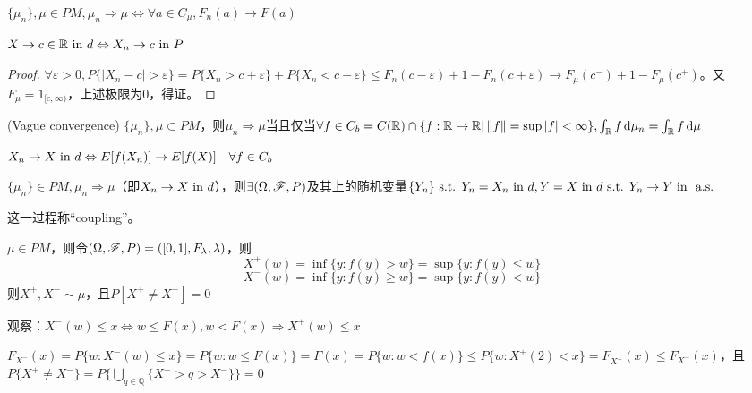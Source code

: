 \documentclass{ctexart}
\begin{document}
\begin{Cor}
  $\{\mu_{n}\},\mu\in PM,\mu_{n}\Rightarrow \mu\Leftrightarrow \forall a\in C_{\mu}, F_{n}(a)\to F(a)$
\end{Cor}

\begin{Prop}
  $X\to c\in\mathbb{R}\text{ in } d\Leftrightarrow X_{n}\to c\text{ in } P$
\end{Prop}

\begin{proof}
  $\forall\varepsilon>0, P\{|X_{n}-c|>\varepsilon\}=P\{X_{n}>c+\varepsilon\}+P\{X_{n}<c-\varepsilon\}\leq F_{n}(c-\varepsilon)+1-F_{n}(c+\varepsilon)\to F_{\mu}(c^{-})+1-F_{\mu}(c^{+})$。又$F_{\mu}=1_{[c,\infty)}$，上述极限为$0$，得证。
\end{proof}

\begin{Thm}(Vague convergence)
  $\{\mu_{n}\},\mu\subset PM$，则$\mu_{n}\Rightarrow \mu$当且仅当$\forall f\in C_{b}=C(\mathbb{R})\cap \{f:\mathbb{R}\to \mathbb{R} | \left\|f\right\|=\sup|f|<\infty\}, \int_{\mathbb{R}}f\,\mathrm{d}\mu_{n}=\int_{\mathbb{R}}f\,\mathrm{d}\mu$
\end{Thm}

\begin{Cor}
  $X_{n}\to X\text{ in } d\Leftrightarrow E[f(X_{n})]\to E[f(X)]\quad \forall f\in C_{b}$
\end{Cor}

\begin{Thm}
  $\{\mu_{n}\}\in PM, \mu_{n}\Rightarrow \mu$（即$X_{n}\to X\text{ in } d$），则$\exists (\Omega,\mathscr{F},P)$及其上的随机变量$\{Y_{n}\}\text{ s.t. } Y_{n}= X_{n}\text{ in } d, Y=X\text{ in } d\text{ s.t. } Y_{n}\to Y\text{ in } \text{ a.s. }$
\end{Thm}
这一过程称``coupling''。

\begin{Lemma}
  $\mu\in PM$，则令$(\Omega,\mathscr{F},P)=([0,1],F_\lambda,\lambda)$，则
  \[X^{+}(w)=\inf\{y:f(y)>w\}=\sup\{y:f(y)\leq w\}\]
  \[X^{-}(w)=\inf\{y:f(y)\geq w\}=\sup\{y:f(y)<w\}\]
  则$X^{+},X^{-}\sim\mu$，且$P[X^{+}\neq X^{-}]=0$
\end{Lemma}

观察：$X^{-}(w)\leq x\Leftrightarrow w\leq F(x), w<F(x)\Rightarrow X^{+}(w)\leq x$

$F_{X^{-}}(x)=P\{w:X^{-}(w)\leq x\}=P\{w:w\leq F(x)\}=F(x)=P\{w:w<f(x)\}\leq P\{w:X^{+}(2)<x\}=F_{X^{+}}(x)\leq F_{X^{-}}(x)$，且$P\{X^{+}\neq X^{-}\}=P\{\bigcup_{q\in\mathbb{Q}}\{X^{+}>q>X^{-}\}\}=0$
\end{document}
